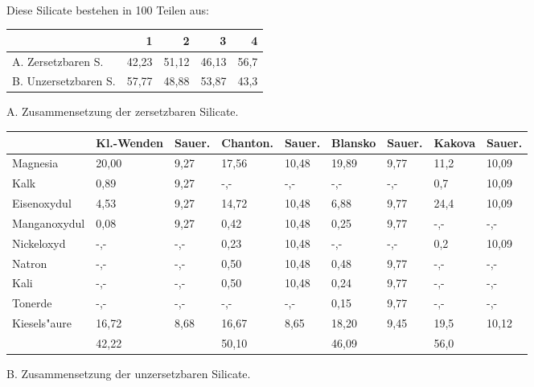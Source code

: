 \documentclass[a4paper, 11pt, oneside, german]{article}
\begin{document}
\paragraph{}
Diese Silicate bestehen in 100 Teilen aus:
\begin{center}
\begin{tabular}{ |l|r|r|r|r| }
    \hline
     & 1 & 2 & 3 & 4\\
    \hline\hline
    A. Zersetzbaren S. & 42,23 & 51,12 & 46,13 & 56,7\\\hline
    B. Unzersetzbaren S. & 57,77 & 48,88 & 53,87 & 43,3\\
    \hline
\end{tabular}
\end{center}
\clearpage
\begin{center}
A. Zusammensetzung der zersetzbaren Silicate.
\end{center}
\begin{center}
\begin{tabular}{ |p{23mm}|p{12mm}|p{8mm}|p{13mm}|p{8mm}|p{11mm}|p{8mm}|p{10mm}|p{8mm}| }
    \hline
     & Kl.-Wenden & Sauer. & Chanton. & Sauer. & Blansko & Sauer. & Kakova & Sauer.\\
    \hline\hline
    Magnesia & 20,00 & 9,27 & 17,56 & 10,48 & 19,89 & 9,77 & 11,2 & 10,09\\\hline
    Kalk & 0,89 & 9,27 & -,- & -,- & -,- & -,- & 0,7 & 10,09\\\hline
    Eisenoxydul & 4,53 & 9,27 & 14,72 & 10,48 & 6,88 & 9,77 & 24,4 & 10,09\\\hline
    Manganoxydul & 0,08 & 9,27 & 0,42 & 10,48 & 0,25 & 9,77 & -,- & -,-\\\hline
    Nickeloxyd & -,- & -,- & 0,23 & 10,48 & -,- & -,- & 0,2 & 10,09\\\hline
    Natron & -,- & -,- & 0,50 & 10,48 & 0,48 & 9,77 & -,- & -,-\\\hline
    Kali & -,- & -,- & 0,50 & 10,48 & 0,24 & 9,77 & -,- & -,-\\\hline
    Tonerde & -,- & -,- & -,- & -,- & 0,15 & 9,77 & -,- & -,-\\\hline
    Kiesels"aure & 16,72 & 8,68 & 16,67 & 8,65 & 18,20 & 9,45 & 19,5 & 10,12\\\hline
     & 42,22 & & 50,10 & & 46,09 & & 56,0 & \\
    \hline
\end{tabular}
\end{center}
\vspace{\medskipamount}
\begin{center}
B. Zusammensetzung der unzersetzbaren Silicate.
\end{center}
\end{document}
